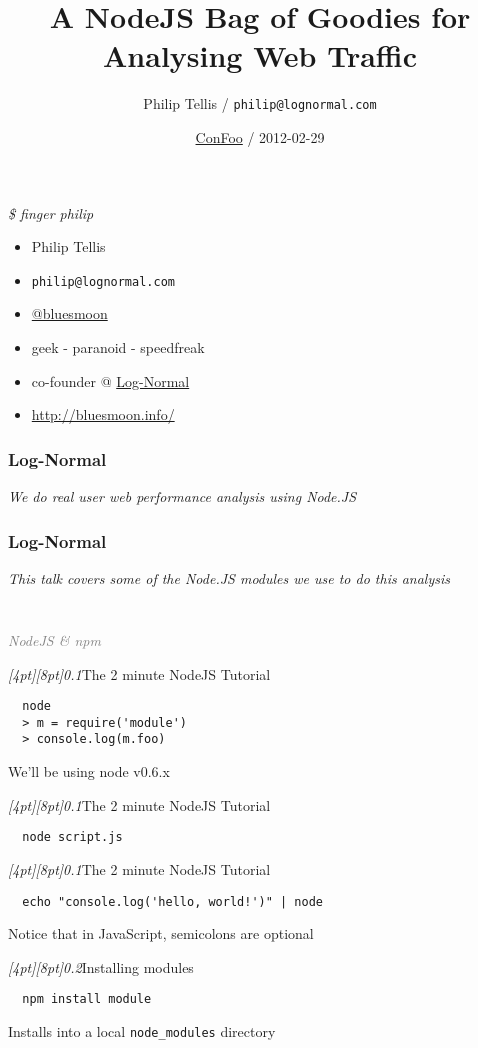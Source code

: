 \documentclass{beamer}
\author{Philip Tellis / \texttt{philip@lognormal.com}}
\title{A NodeJS Bag of Goodies for Analysing Web Traffic}
\date{\href{http://confoo.ca/}{ConFoo} / 2012-02-29}
\newcommand{\sn}[1]{\textrm{\textit{\Huge{\raisebox{-3pt}[4pt][8pt]{\textcolor{f2elblue}{#1}}}}}\hspace{4pt}}
\newcommand{\innersplash}[1]{
  \begin{center}
    \large \textrm{\textit{ #1 } }
  \end{center}
}
\newcommand{\splashslide}[2][{}]{
  \begin{frame}
  \frametitle{#1}
  \innersplash{#2}
  \end{frame}
}
\newcommand{\leadinslide}[2]{
  \splashslide{
     {\fontsize{150}{20}\selectfont{\raisebox{0pt}[90pt][0pt]{\textcolor{light-gray}{#1}}}} \\ \huge \textcolor{gray}{#2}
  }
}
\begin{document}
\begin{frame}
  \titlepage
\end{frame}


\begin{frame}{\textit{\$ finger philip}}
  \begin{itemize}
  \item Philip Tellis
  \item \small{\texttt{philip@lognormal.com}}
  \item \href{http://twitter.com/bluesmoon}{@bluesmoon}
  \item geek - paranoid - speedfreak
  \item co-founder @ \href{http://www.lognormal.com/}{Log-Normal}
  \item \href{http://bluesmoon.info/}{http://bluesmoon.info/}
  \end{itemize}
\end{frame}

\splashslide[Log-Normal]{We do real user web performance analysis using Node.JS}

\splashslide[Log-Normal]{This talk covers some of the Node.JS modules we use to do this analysis}

\leadinslide{--}{NodeJS \& npm}

\begin{frame}[fragile]{\sn{0.1}The 2 minute NodeJS Tutorial}
\begin{verbatim}
  node
  > m = require('module')
  > console.log(m.foo)
\end{verbatim}
We'll be using node v0.6.x
\end{frame}

\begin{frame}[fragile]{\sn{0.1}The 2 minute NodeJS Tutorial}
\begin{verbatim}
  node script.js
\end{verbatim}
\end{frame}

\begin{frame}[fragile]{\sn{0.1}The 2 minute NodeJS Tutorial}
\begin{verbatim}
  echo "console.log('hello, world!')" | node
\end{verbatim}
Notice that in JavaScript, semicolons are optional
\end{frame}

\begin{frame}[fragile]{\sn{0.2}Installing modules}
\begin{verbatim}
  npm install module
\end{verbatim}
Installs into a local \texttt{node\_modules} directory
\end{frame}
\end{document}

